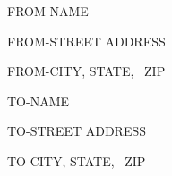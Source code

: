 \documentclass{letter}
\begin{document}
FROM-NAME

FROM-STREET ADDRESS

FROM-CITY, STATE, \ ZIP

\vspace{1.0in}\large
\setlength\parindent{3.6in}

TO-NAME

TO-STREET ADDRESS

TO-CITY, STATE, \ ZIP
\end{document}
